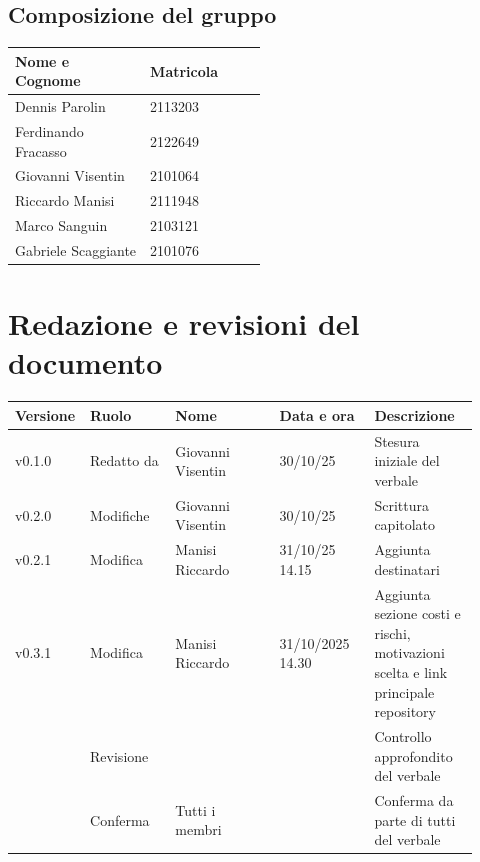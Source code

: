 \documentclass[a4paper,12pt]{article}
\begin{document}
\subsection{Composizione del gruppo}

\begin{center}
\small
\renewcommand{\arraystretch}{1.2}
\begin{tabular}{|p{0.3\linewidth}|p{0.2\linewidth}|}
\hline
\rowcolor{gray!60}
\textbf{Nome e Cognome} & \textbf{Matricola} \\
\hline
Dennis Parolin & 2113203 \\
\hline
Ferdinando Fracasso & 2122649 \\
\hline
Giovanni Visentin & 2101064 \\
\hline
Riccardo Manisi & 2111948 \\
\hline
Marco Sanguin & 2103121 \\
\hline
Gabriele Scaggiante & 2101076 \\
\hline
\end{tabular}
\end{center}

\clearpage
\section{Redazione e revisioni del documento}

\begin{center}
\small
\renewcommand{\arraystretch}{1.2} 
\begin{tabular}{|p{0.1\linewidth}|p{0.18\linewidth}|p{0.22\linewidth}|p{0.20\linewidth}|p{0.22\linewidth}|}
\hline
\rowcolor{gray!60} 
\textbf{Versione} & \textbf{Ruolo} & \textbf{Nome} & \textbf{Data e ora} & \textbf{Descrizione} \\
\hline
\rowcolor{white}
v0.1.0 & Redatto da & Giovanni Visentin & 30/10/25 & Stesura iniziale del verbale \\
\hline
\rowcolor{gray!20}
v0.2.0 & Modifiche & Giovanni Visentin & 30/10/25 &  Scrittura capitolato\\
\hline
\rowcolor{white}
v0.2.1 & Modifica & Manisi Riccardo & 31/10/25 14.15 & Aggiunta destinatari \\
\hline
\rowcolor{gray!20}
v0.3.1 & Modifica & Manisi Riccardo & 31/10/2025 14.30 & Aggiunta sezione costi e rischi, motivazioni scelta e link principale repository \\
\hline
\rowcolor{white}
 & Revisione &  &  & Controllo approfondito del verbale \\
\hline
\rowcolor{gray!20}
 & Conferma & Tutti i membri &  & Conferma da parte di tutti del verbale \\
\hline

\end{tabular}
\end{center}
\end{document}
